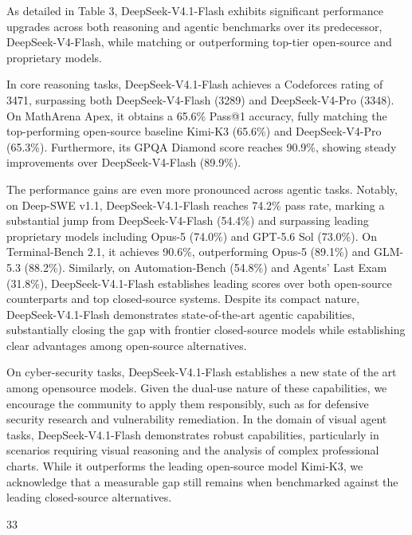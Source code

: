 \documentclass[
  10
]{article}
\begin{document}
As detailed in Table 3, DeepSeek-V4.1-Flash exhibits significant
performance upgrades across both reasoning and agentic benchmarks over
its predecessor, DeepSeek-V4-Flash, while matching or outperforming
top-tier open-source and proprietary models.

In core reasoning tasks, DeepSeek-V4.1-Flash achieves a Codeforces
rating of 3471, surpassing both DeepSeek-V4-Flash (3289) and
DeepSeek-V4-Pro (3348). On MathArena Apex, it obtains a 65.6\% Pass@1
accuracy, fully matching the top-performing open-source baseline Kimi-K3
(65.6\%) and DeepSeek-V4-Pro (65.3\%). Furthermore, its GPQA Diamond
score reaches 90.9\%, showing steady improvements over DeepSeek-V4-Flash
(89.9\%).

The performance gains are even more pronounced across agentic tasks.
Notably, on Deep-SWE v1.1, DeepSeek-V4.1-Flash reaches 74.2\% pass rate,
marking a substantial jump from DeepSeek-V4-Flash (54.4\%) and
surpassing leading proprietary models including Opus-5 (74.0\%) and
GPT-5.6 Sol (73.0\%). On Terminal-Bench 2.1, it achieves 90.6\%,
outperforming Opus-5 (89.1\%) and GLM-5.3 (88.2\%). Similarly, on
Automation-Bench (54.8\%) and Agents' Last Exam (31.8\%),
DeepSeek-V4.1-Flash establishes leading scores over both open-source
counterparts and top closed-source systems. Despite its compact nature,
DeepSeek-V4.1-Flash demonstrates state-of-the-art agentic capabilities,
substantially closing the gap with frontier closed-source models while
establishing clear advantages among open-source alternatives.

On cyber-security tasks, DeepSeek-V4.1-Flash establishes a new state of
the art among opensource models. Given the dual-use nature of these
capabilities, we encourage the community to apply them responsibly, such
as for defensive security research and vulnerability remediation. In the
domain of visual agent tasks, DeepSeek-V4.1-Flash demonstrates robust
capabilities, particularly in scenarios requiring visual reasoning and
the analysis of complex professional charts. While it outperforms the
leading open-source model Kimi-K3, we acknowledge that a measurable gap
still remains when benchmarked against the leading closed-source
alternatives.

33
\end{document}

